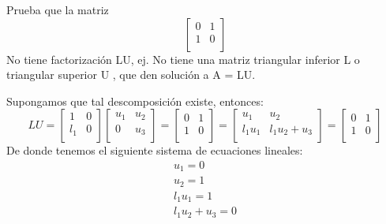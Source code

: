 \documentclass[paper=letter, fontsize=11pt]{scrartcl}
\numberwithin{equation}{section} %
\numberwithin{figure}{section} %
\numberwithin{table}{section} %
\newenvironment{cframed}[1][blue]
  {\begin{tcolorbox}[colframe=#1,colback=white]}
  {\end{tcolorbox}}
\begin{document}
\begin{enumerate}
\begin{cframed}[violet]
\item Prueba que la matriz
\[
\begin{bmatrix}
0 & 1   \\
1 & 0\\
\end{bmatrix}
\]
No tiene factorización LU, ej. No tiene una matriz triangular inferior L o triangular superior U , que den solución a A = LU.
\end{cframed}
Supongamos que tal descomposición existe, entonces:
\[ LU = 
\begin{bmatrix}
1 & 0   \\
l_1& 0\\
\end{bmatrix}   \begin{bmatrix}
u_1 & u_2   \\
0 & u_3\\
\end{bmatrix}  =
\begin{bmatrix}
0 & 1   \\
1 & 0\\
\end{bmatrix} =
\begin{bmatrix}
u_1 & u_2   \\
l_1u_1 & l_1u_2+u_3\\
\end{bmatrix} = \begin{bmatrix}
0 & 1   \\
1 & 0\\
\end{bmatrix}
\]
De donde tenemos el siguiente sistema de ecuaciones lineales:
\[
\begin{split}
u_1 = 0\\
u_2 = 1\\
l_1u_1 = 1\\
l_1u_2 + u_3 = 0
\end{split}
\]


\end{enumerate}
\end{document}
